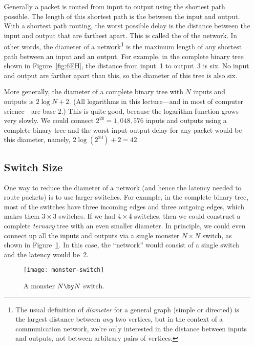 Generally a packet is routed from input to output using the shortest
path possible.  The length of this shortest path is the
 between the input and output.  With a shortest path
routing, the worst possible delay is the distance between the input
and output that are farthest apart.  This is called the
 of the network.  In other words, the diameter of a
network\footnote{The usual definition of \emph{diameter} for a general
  graph (simple or directed) is the largest distance between
  \emph{any} two vertices, but in the context of a communication
  network, we're only interested in the distance between inputs and
  outputs, not between arbitrary pairs of vertices.} is the maximum
length of any shortest path between an input and an output.  For
example, in the complete binary tree shown in Figure~\ref{fig:6EH},
the distance from input~1 to output~3 is six.  No input and output are
farther apart than this, so the diameter of this tree is also six.

More generally, the diameter of a complete binary tree with $N$ inputs
and outputs is $2 \log N + 2$.  (All logarithms in this lecture---and
in most of computer science---are base 2.)  This is quite good,
because the logarithm function grows very slowly.  We could connect
$2^{20} = 1{,}048{,}576$ inputs and outputs using a complete binary
tree and the worst input-output delay for any packet would be this
diameter, namely, $2 \log(2^{20}) + 2 = 42$.

\subsection{Switch Size}

One way to reduce the diameter of a network (and hence the latency
needed to route packets) is to use larger switches.  For example, in
the complete binary tree, most of the switches have three incoming
edges and three outgoing edges, which makes them $3 \times 3$
switches.  If we had $4 \times 4$ switches, then we could construct a
complete \emph{ternary} tree with an even smaller diameter.  In
principle, we could even connect up all the inputs and outputs via a
single monster $N \times N$ switch, as shown in Figure~\ref{fig:6EI}.
In this case, the ``network'' would consist of a single switch and the
latency would be~2.

\begin{figure}

\texttt{[image: monster-switch]}


\caption{A monster $N \by N$ switch.}

\label{fig:6EI}

\end{figure}

